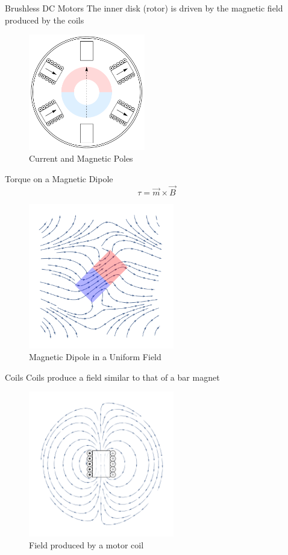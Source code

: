 \documentclass{beamer}
\begin{document}
    \begin{frame}{Brushless DC Motors}
        The inner disk (rotor) is driven by the magnetic field produced by the coils
        \begin{figure}
            \center
            \includegraphics[width=2in]{motor_arrows.pdf}
            \caption*{Current and Magnetic Poles}
        \end{figure}
    \end{frame}

    \begin{frame}{Torque on a Magnetic Dipole}
        \[\tau = \vec{m} \times \vec{B}\]
        \begin{figure}
            \center
            \includegraphics[width=2.5in]{Momento_torcente_magnetico.pdf}
            \caption*{Magnetic Dipole in a Uniform Field}
        \end{figure}
    \end{frame}

    \begin{frame}{Coils}
        Coils produce a field similar to that of a bar magnet
        \begin{figure}
            \center
            \includegraphics[width=2.5in]{coil.pdf}
            \caption*{Field produced by a motor coil}
        \end{figure}
    \end{frame}
    
\end{document}
